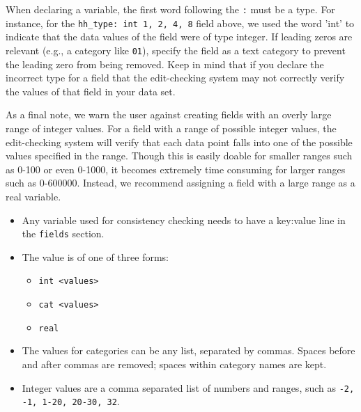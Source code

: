 \documentclass{article}
\begin{document}
When declaring a variable, the first word following the {\tt :} must be a type. For instance, 
for the {\tt hh\_type: int 1, 2, 4, 8} field above, we used the word 'int' to indicate that 
the data values of the field were of type integer. If leading zeros are relevant (e.g.,
a category like {\tt 01}), specify the field as a text category to prevent the leading
zero from being removed.  Keep in mind 
that if you declare the incorrect type for a field that the edit-checking system may not correctly 
verify the values of that field in your data set.

As a final note, we warn the user against creating fields with an overly large range of integer 
values. For a field with a range of possible integer values, the edit-checking system will
verify that each data point falls into one of the possible values specified in the range. Though
this is easily doable for smaller ranges such as 0-100 or even 0-1000, it becomes
extremely time consuming for larger ranges such as 0-600000. Instead, we recommend
assigning a field with a large range as a real variable.


\begin{itemize}
\item Any variable used for consistency checking needs to have a key:value line in the
{\tt fields} section.
\item The value is of one of three forms:
    \begin{itemize}
    \item {\tt int <values>}
    \item {\tt cat <values>}
    \item {\tt real}
    \end{itemize}
\item The values for categories can be any list, separated by commas. Spaces before and
after commas are removed; spaces within category names are kept. 
\item Integer values are a comma separated list of numbers and ranges, such as {\tt -2, -1, 1-20, 20-30, 32}.
\end{itemize}

%
\end{document}
